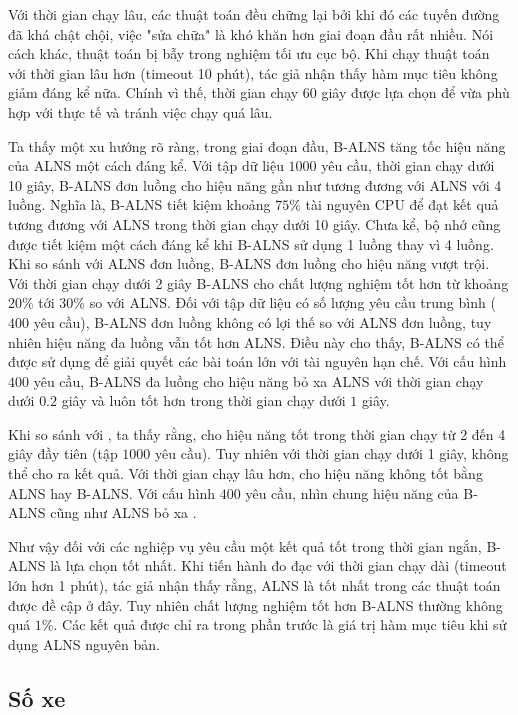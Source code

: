 Với thời gian chạy lâu, các thuật toán đều chững lại bởi khi đó các tuyến đường đã khá chật chội, việc "sửa chữa" là khó khăn hơn giai đoạn đầu rất nhiều. Nói cách khác, thuật toán bị bẫy trong nghiệm tối ưu cục bộ. Khi chạy thuật toán với thời gian lâu hơn (timeout 10 phút), tác giả nhận thấy hàm mục tiêu không giảm đáng kể nữa. Chính vì thế, thời gian chạy 60 giây được lựa chọn để vừa phù hợp với thực tế và tránh việc chạy quá lâu.

Ta thấy một xu hướng rõ ràng, trong giai đoạn đầu, B-ALNS tăng tốc hiệu năng của ALNS một cách đáng kể. Với tập dữ liệu $1000$ yêu cầu, thời gian chạy dưới 10 giây, B-ALNS đơn luồng cho hiệu năng gần như tương đương với ALNS với 4 luồng. Nghĩa là, B-ALNS tiết kiệm khoảng $75\%$ tài nguyên CPU để đạt kết quả tương đương với ALNS trong thời gian chạy dưới 10 giây. Chưa kể, bộ nhớ cũng được tiết kiệm một cách đáng kể khi B-ALNS sử dụng 1 luồng thay vì 4 luồng. Khi so sánh với ALNS đơn luồng, B-ALNS đơn luồng cho hiệu năng vượt trội. Với thời gian chạy dưới 2 giây B-ALNS cho chất lượng nghiệm tốt hơn từ khoảng $20\%$ tới $30\%$ so với ALNS. Đối với tập dữ liệu có số lượng yêu cầu trung bình ($400$ yêu cầu), B-ALNS đơn luồng không có lợi thế so với ALNS đơn luồng, tuy nhiên hiệu năng đa luồng vẫn tốt hơn ALNS. Điều này cho thấy, B-ALNS có thể được sử dụng để giải quyết các bài toán lớn với tài nguyên hạn chế. Với cấu hình $400$ yêu cầu, B-ALNS đa luồng cho hiệu năng bỏ xa ALNS với thời gian chạy dưới $0.2$ giây và luôn tốt hơn trong thời gian chạy dưới $1$ giây.

Khi so sánh với , ta thấy rằng,  cho hiệu năng tốt trong thời gian chạy từ 2 đến 4 giây đầy tiên (tập $1000$ yêu cầu). Tuy nhiên với thời gian chạy dưới 1 giây,  không thể cho ra kết quả. Với thời gian chạy lâu hơn,  cho hiệu năng không tốt bằng ALNS hay B-ALNS. Với cấu hình $400$ yêu cầu, nhìn chung hiệu năng của B-ALNS cũng như ALNS bỏ xa .

Như vậy đối với các nghiệp vụ yêu cầu một kết quả tốt trong thời gian ngắn, B-ALNS là lựa chọn tốt nhất. Khi tiến hành đo đạc với thời gian chạy dài (timeout lớn hơn 1 phút), tác giả nhận thấy rằng, ALNS là tốt nhất trong các thuật toán được đề cập ở đây. Tuy nhiên chất lượng nghiệm tốt hơn B-ALNS thường không quá $1\%$. Các kết quả được chỉ ra trong phần trước là giá trị hàm mục tiêu khi sử dụng ALNS nguyên bản.

\subsection{Số xe}

